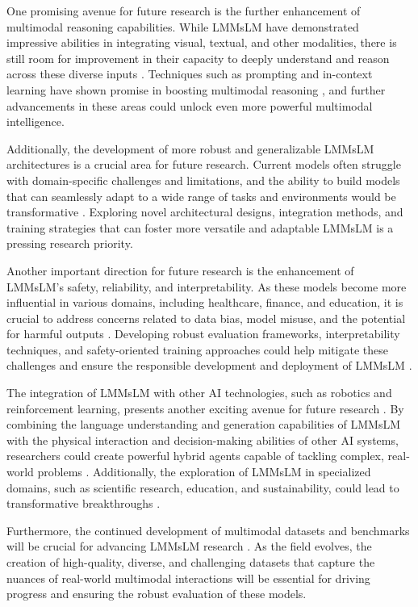 \documentclass[11pt]{article}
\begin{document}
One promising avenue for future research is the further enhancement of multimodal reasoning capabilities. While LMMsLM have demonstrated impressive abilities in integrating visual, textual, and other modalities, there is still room for improvement in their capacity to deeply understand and reason across these diverse inputs \cite{ref78}. Techniques such as prompting and in-context learning have shown promise in boosting multimodal reasoning \cite{ref94}, and further advancements in these areas could unlock even more powerful multimodal intelligence.

Additionally, the development of more robust and generalizable LMMsLM architectures is a crucial area for future research. Current models often struggle with domain-specific challenges and limitations, and the ability to build models that can seamlessly adapt to a wide range of tasks and environments would be transformative \cite{ref343}. Exploring novel architectural designs, integration methods, and training strategies that can foster more versatile and adaptable LMMsLM is a pressing research priority.

Another important direction for future research is the enhancement of LMMsLM's safety, reliability, and interpretability. As these models become more influential in various domains, including healthcare, finance, and education, it is crucial to address concerns related to data bias, model misuse, and the potential for harmful outputs \cite{ref105}. Developing robust evaluation frameworks, interpretability techniques, and safety-oriented training approaches could help mitigate these challenges and ensure the responsible development and deployment of LMMsLM \cite{ref344}.

The integration of LMMsLM with other AI technologies, such as robotics and reinforcement learning, presents another exciting avenue for future research \cite{ref345}. By combining the language understanding and generation capabilities of LMMsLM with the physical interaction and decision-making abilities of other AI systems, researchers could create powerful hybrid agents capable of tackling complex, real-world problems \cite{ref109}. Additionally, the exploration of LMMsLM in specialized domains, such as scientific research, education, and sustainability, could lead to transformative breakthroughs \cite{ref346,ref347,ref110}.

Furthermore, the continued development of multimodal datasets and benchmarks will be crucial for advancing LMMsLM research \cite{ref48}. As the field evolves, the creation of high-quality, diverse, and challenging datasets that capture the nuances of real-world multimodal interactions will be essential for driving progress and ensuring the robust evaluation of these models.
\end{document}
